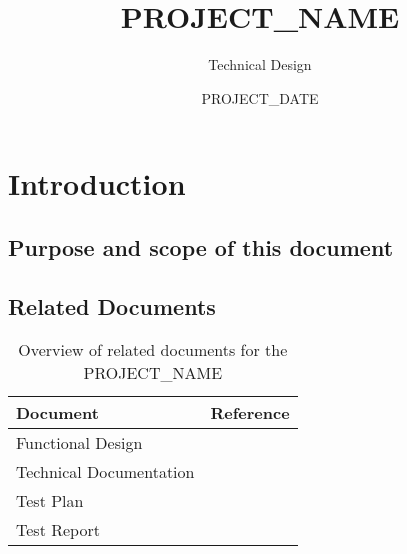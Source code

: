 \documentclass[signature]{deltares_report}
\begin{document}
\pagestyle{empty}
\cleardoublepage
%

\newcommand{\ProgramName}{PROJECT_NAME\xspace}

\title{\ProgramName}
\subtitle{Technical Design}
\classification{-}

\date{PROJECT_DATE}



\summary{}

\revieweri{}
\approvali{}

\disclaimer{}



\chapter{Introduction} 
\label{chapterIntroduction}

\section{Purpose and scope of this document} \label{sec:PurposeAndScope}

\section{Related Documents}
\label{sec:RelatedDocuments}
\bigskip
\begin{longtable}{|p{}|p{}|}
\caption{Overview of related documents for the \ProgramName \label{tab:RelatedDocuments}}\\	\hline
		\hline 
		\textbf{Document} & \textbf{Reference} \\
		\hline 
		\hline 
		Functional Design & \citep{PROJECT_NAME_FunctionalDesignPROJECT_YEAR} \\
		Technical Documentation & \citep{PROJECT_NAME_TechnicalDocumentationPROJECT_YEAR} \\
		Test Plan & \citep{PROJECT_NAME_TestPlanPROJECT_YEAR} \\
		Test Report & \citep{PROJECT_NAME_TestReportPROJECT_YEAR} \\
    \hline			
\end{longtable}
\end{document}
